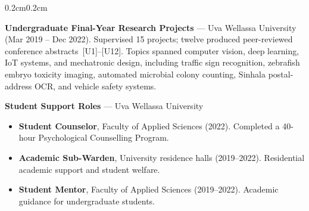 \documentclass[10pt, letterpaper]{article}
\newenvironment{highlights}{%
    \begin{itemize}[topsep=0.08cm, parsep=0.08cm, partopsep=0pt,
                    itemsep=0pt, leftmargin=0.4cm + 10pt]
}{\end{itemize}}
\newenvironment{onecolentry}{%
    \begin{adjustwidth}{0.2cm}{0.2cm}
}{\end{adjustwidth}}
\begin{document}
\begin{onecolentry}
    \textbf{Undergraduate Final-Year Research Projects} --- Uva Wellassa University
    (Mar 2019 -- Dec 2022). Supervised 15 projects; twelve produced peer-reviewed
    conference abstracts~[U1]--[U12]. Topics spanned computer vision, deep learning,
    IoT systems, and mechatronic design, including traffic sign recognition,
    zebrafish embryo toxicity imaging, automated microbial colony counting, Sinhala
    postal-address OCR, and vehicle safety systems.
    \vspace{0.12cm}

    \textbf{Student Support Roles} --- Uva Wellassa University
    \begin{highlights}
        \item \textbf{Student Counselor}, Faculty of Applied Sciences (2022).
              Completed a 40-hour Psychological Counselling Program.
        \item \textbf{Academic Sub-Warden}, University residence halls (2019--2022).
              Residential academic support and student welfare.
        \item \textbf{Student Mentor}, Faculty of Applied Sciences (2019--2022).
              Academic guidance for undergraduate students.
    \end{highlights}
\end{onecolentry}
\vspace{0.10cm}

\end{document}
